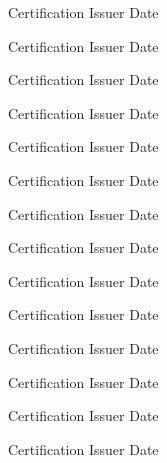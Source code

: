 

\begin{cvhonors}

  \cvhonor
    {Certification} %
    {Issuer} %
    {} %
    {Date} %

  \cvhonor
    {Certification} %
    {Issuer} %
    {} %
    {Date} %

  \cvhonor
    {Certification} %
    {Issuer} %
    {} %
    {Date} %

  \cvhonor
    {Certification} %
    {Issuer} %
    {} %
    {Date} %

  \cvhonor
    {Certification} %
    {Issuer} %
    {} %
    {Date} %

  \cvhonor
    {Certification} %
    {Issuer} %
    {} %
    {Date} %

  \cvhonor
    {Certification} %
    {Issuer} %
    {} %
    {Date} %

  \cvhonor
    {Certification} %
    {Issuer} %
    {} %
    {Date} %

  \cvhonor
    {Certification} %
    {Issuer} %
    {} %
    {Date} %

  \cvhonor
    {Certification} %
    {Issuer} %
    {} %
    {Date} %

  \cvhonor
    {Certification} %
    {Issuer} %
    {} %
    {Date} %

  \cvhonor
    {Certification} %
    {Issuer} %
    {} %
    {Date} %

  \cvhonor
    {Certification} %
    {Issuer} %
    {} %
    {Date} %

  \cvhonor
    {Certification} %
    {Issuer} %
    {} %
    {Date} %

\end{cvhonors}

